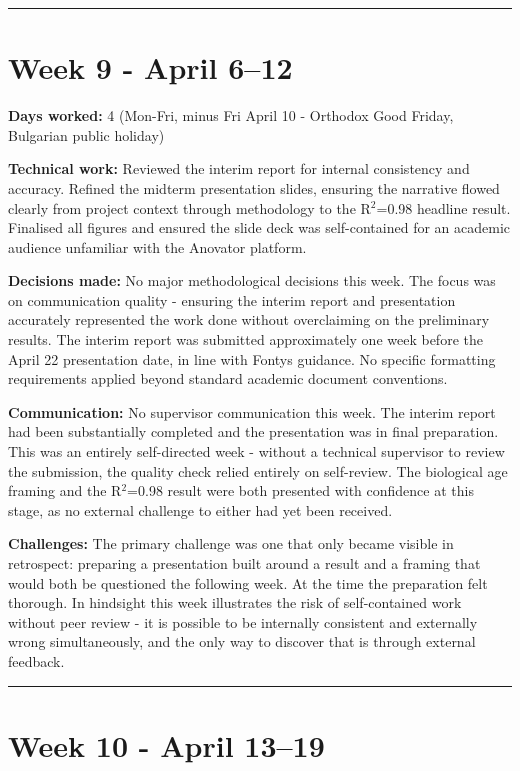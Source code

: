 \documentclass[11pt,a4paper]{article}
\begin{document}
\noindent\rule{\textwidth}{0.4pt}


\section{Week 9  -  April 6–12}

\textbf{Days worked:} 4 (Mon-Fri, minus Fri April 10 - Orthodox Good Friday, Bulgarian public holiday)

\textbf{Technical work:} Reviewed the interim report for internal consistency and accuracy. Refined the midterm presentation slides, ensuring the narrative flowed clearly from project context through methodology to the R$^{2}$=0.98 headline result. Finalised all figures and ensured the slide deck was self-contained for an academic audience unfamiliar with the Anovator platform.

\textbf{Decisions made:} No major methodological decisions this week. The focus was on communication quality  -  ensuring the interim report and presentation accurately represented the work done without overclaiming on the preliminary results. The interim report was submitted approximately one week before the April 22 presentation date, in line with Fontys guidance. No specific formatting requirements applied beyond standard academic document conventions.

\textbf{Communication:} No supervisor communication this week. The interim report had been substantially completed and the presentation was in final preparation. This was an entirely self-directed week  -  without a technical supervisor to review the submission, the quality check relied entirely on self-review. The biological age framing and the R$^{2}$=0.98 result were both presented with confidence at this stage, as no external challenge to either had yet been received.

\textbf{Challenges:} The primary challenge was one that only became visible in retrospect: preparing a presentation built around a result and a framing that would both be questioned the following week. At the time the preparation felt thorough. In hindsight this week illustrates the risk of self-contained work without peer review  -  it is possible to be internally consistent and externally wrong simultaneously, and the only way to discover that is through external feedback.

\noindent\rule{\textwidth}{0.4pt}


\section{Week 10  -  April 13–19}
\end{document}
